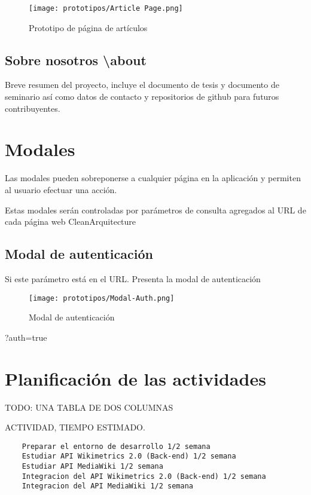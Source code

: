 \begin{figure}[H]
    \centering
    \texttt{[image: prototipos/Article Page.png]}
    \caption{Prototipo de página de artículos}
    \label{PrototipoSettingsPage}
\end{figure}

\subsection{Sobre nosotros \textbackslash about}
Breve resumen del proyecto, incluye el documento de tesis y documento de seminario así como datos de contacto y repositorios de github para futuros contribuyentes.

\section{Modales}
Las modales pueden sobreponerse a cualquier página en la aplicación y permiten al usuario efectuar una acción.

Estas modales serán controladas por parámetros de consulta agregados al URL de cada página web
CleanArquitecture
\subsection{Modal de autenticación}

Si este parámetro está en el URL. Presenta la modal de autenticación

\begin{figure}[H]
    \centering
    \texttt{[image: prototipos/Modal-Auth.png]}
    \caption{Modal de autenticación}
    \label{ModalAuth}
\end{figure}
?auth=true

\section{Planificación de las actividades}

TODO: UNA TABLA DE DOS COLUMNAS

ACTIVIDAD, TIEMPO ESTIMADO.

\begin{lstlisting}
    Preparar el entorno de desarrollo 1/2 semana
    Estudiar API Wikimetrics 2.0 (Back-end) 1/2 semana
    Estudiar API MediaWiki 1/2 semana
    Integracion del API Wikimetrics 2.0 (Back-end) 1/2 semana
    Integracion del API MediaWiki 1/2 semana
\end{lstlisting}